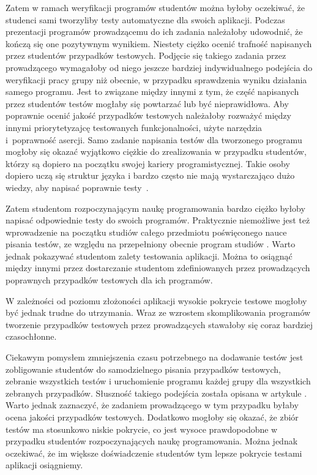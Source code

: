 Zatem w ramach weryfikacji programów studentów można byłoby oczekiwać, że studenci sami tworzyliby testy automatyczne dla swoich aplikacji.
Podczas prezentacji programów prowadzącemu do ich zadania należałoby udowodnić, że kończą się one pozytywnym wynikiem.
Niestety ciężko ocenić trafność napisanych przez studentów przypadków testowych.
Podjęcie się takiego zadania przez prowadzącego wymagałoby od niego jeszcze bardziej indywidualnego podejścia do weryfikacji pracy grupy niż obecnie, w przypadku sprawdzenia wyniku działania samego programu.
Jest to związane między innymi z tym, że część napisanych przez studentów testów mogłaby się powtarzać lub być nieprawidłowa.
Aby poprawnie ocenić jakość przypadków testowych należałoby rozważyć  między innymi priorytetyzajcę testowanych funkcjonalności, użyte narzędzia i~poprawność asercji.
Samo zadanie napisania testów dla tworzonego programu mogłoby się okazać wyjątkowo ciężkie do zrealizowania w przypadku studentów, którzy są dopiero na początku swojej kariery programistycznej.
Takie osoby dopiero uczą się struktur języka i bardzo często nie mają wystarczająco dużo wiedzy, aby napisać poprawnie testy~\cite{tests-and-begginers}.

Zatem studentom rozpoczynającym naukę programowania bardzo ciężko byłoby napisać odpowiednie testy do swoich programów.
Praktycznie niemożliwe jest też wprowadzenie na początku studiów całego przedmiotu poświęconego nauce pisania testów, ze względu na przepełniony obecnie program studiów \cite{overflow-studies-program}.
Warto jednak pokazywać studentom zalety testowania aplikacji.
Można to osiągnąć między innymi przez dostarczanie studentom zdefiniowanych przez prowadzących poprawnych przypadków testowych dla ich programów.

W zależności od poziomu złożoności aplikacji wysokie pokrycie testowe mogłoby być jednak trudne do utrzymania.
Wraz ze wzrostem skomplikowania programów tworzenie przypadków testowych przez prowadzących stawałoby się coraz bardziej czasochłonne.

Ciekawym pomysłem zmniejszenia czasu potrzebnego na dodawanie testów jest zobligowanie studentów do samodzielnego pisania przypadków testowych, zebranie wszystkich testów i uruchomienie programu każdej grupy dla wszystkich zebranych przypadków.
Słuszność takiego podejścia została opisana w artykule \cite{write-tests-by-students}.
Warto jednak zaznaczyć, że zadaniem prowadzącego w tym przypadku byłaby ocena jakości przypadków testowych.
Dodatkowo mogłoby się okazać, że zbiór testów ma stosunkowo niskie pokrycie, co jest wysoce prawdopodobne w przypadku studentów rozpoczynających naukę programowania.
Można jednak oczekiwać, że im większe doświadczenie studentów tym lepsze pokrycie testami aplikacji osiągniemy.

